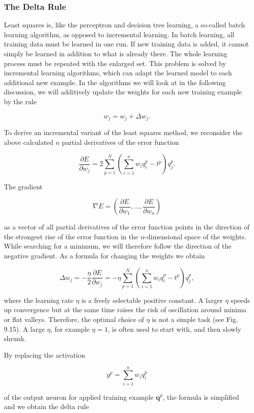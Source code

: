 \documentclass[10pt]{book}
\begin{document}
\subsubsection*{The Delta Rule}
Least squares is, like the perceptron and decision tree learning, a so-called batch learning algorithm, as opposed to incremental learning. In batch learning, all training data must be learned in one run. If new training data is added, it cannot simply be learned in addition to what is already there. The whole learning process must be repeated with the enlarged set. This problem is solved by incremental learning algorithms, which can adapt the learned model to each additional new example. In the algorithms we will look at in the following discussion, we will additively update the weights for each new training example by the rule

$$
w_{j}=w_{j}+\Delta w_{j} .
$$

To derive an incremental variant of the least squares method, we reconsider the above calculated $n$ partial derivatives of the error function

$$
\frac{\partial E}{\partial w_{j}}=2 \sum_{p=1}^{N}\left(\sum_{i=1}^{n} w_{i} q_{i}^{p}-t^{p}\right) q_{j}^{p} .
$$

The gradient

$$
\nabla E=\left(\frac{\partial E}{\partial w_{1}}, \ldots, \frac{\partial E}{\partial w_{n}}\right)
$$

as a vector of all partial derivatives of the error function points in the direction of the strongest rise of the error function in the $n$-dimensional space of the weights. While searching for a minimum, we will therefore follow the direction of the negative gradient. As a formula for changing the weights we obtain

$$
\Delta w_{j}=-\frac{\eta}{2} \frac{\partial E}{\partial w_{j}}=-\eta \sum_{p=1}^{N}\left(\sum_{i=1}^{n} w_{i} q_{i}^{p}-t^{p}\right) q_{j}^{p},
$$

where the learning rate $\eta$ is a freely selectable positive constant. A larger $\eta$ speeds up convergence but at the same time raises the risk of oscillation around minima or flat valleys. Therefore, the optimal choice of $\eta$ is not a simple task (see Fig. 9.15). A large $\eta$, for example $\eta=1$, is often used to start with, and then slowly shrunk.

By replacing the activation

$$
y^{p}=\sum_{i=1}^{n} w_{i} q_{i}^{p}
$$

of the output neuron for applied training example $\boldsymbol{q}^{p}$, the formula is simplified and we obtain the delta rule
\end{document}
